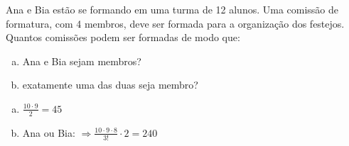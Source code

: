 \begin{ex}
Ana e Bia estão se formando em uma turma de 12 alunos.  Uma comissão de formatura, com 4 membros, deve ser formada para a organização dos festejos. Quantos comissões podem ser formadas de modo que:
   \begin{enumerate}[(a)]
   \item Ana e Bia sejam membros?
   \item exatamente uma das duas seja membro?
   \end{enumerate}
     \begin{sol}
       \phantom{A} 
        \begin{enumerate} [(a)]
            \item $\frac{10\cdot9}{2}=45$
            \item Ana ou Bia: $\Longrightarrow \frac{10\cdot9\cdot8}{3!}\cdot 2= 240$
        \end{enumerate}
     \end{sol}
\end{ex}
